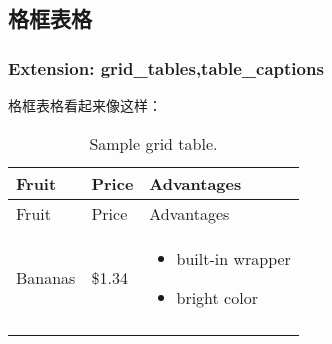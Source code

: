 \documentclass[fancyhdr,bookmark]{ctexbook}
\providecommand{\tightlist}{%
  \setlength{\itemsep}{0pt}\setlength{\parskip}{0pt}}
\begin{document}
\subsection{格框表格}\label{ux683cux6846ux8868ux683c}

\subsubsection{Extension:
grid\_tables,table\_captions}\label{extension-grid_tablestable_captions}

格框表格看起来像这样：

\begin{longtable}[]{@{}lll@{}}
\caption{Sample grid table.}\tabularnewline
\toprule
\begin{minipage}[b]{0.20\columnwidth}\raggedright\strut
Fruit\strut
\end{minipage} & \begin{minipage}[b]{0.20\columnwidth}\raggedright\strut
Price\strut
\end{minipage} & \begin{minipage}[b]{0.27\columnwidth}\raggedright\strut
Advantages\strut
\end{minipage}\tabularnewline
\midrule
\endfirsthead
\toprule
\begin{minipage}[b]{0.20\columnwidth}\raggedright\strut
Fruit\strut
\end{minipage} & \begin{minipage}[b]{0.20\columnwidth}\raggedright\strut
Price\strut
\end{minipage} & \begin{minipage}[b]{0.27\columnwidth}\raggedright\strut
Advantages\strut
\end{minipage}\tabularnewline
\midrule
\endhead
\begin{minipage}[t]{0.32\columnwidth}\raggedright\strut
Bananas\strut
\end{minipage} & \begin{minipage}[t]{0.32\columnwidth}\raggedright\strut
\$1.34\strut
\end{minipage} & \begin{minipage}[t]{0.32\columnwidth}\raggedright\strut
\begin{itemize}
\tightlist
\item
  built-in wrapper
\item
  bright color
\end{itemize}\strut
\end{minipage}\tabularnewline
\begin{minipage}[t]{0.32\columnwidth}\raggedright\strut

\end{minipage}
\end{longtable}
\end{document}
